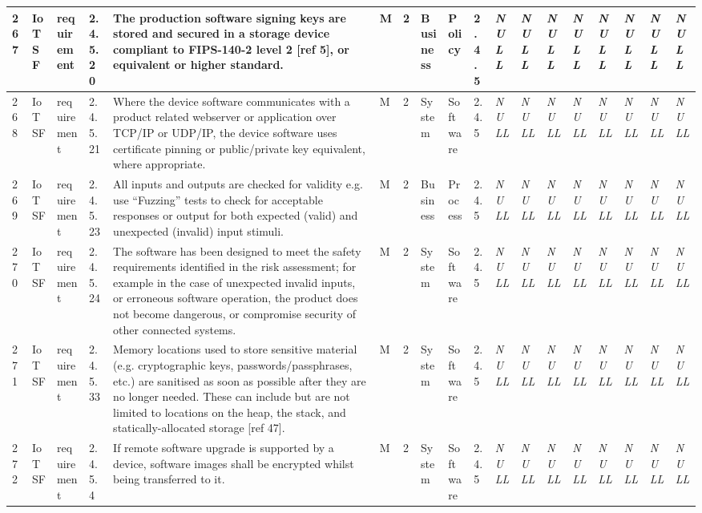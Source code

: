\begin{longtable}{|l|l|l|l|l|l|l|l|l|l|l|l|l|l|l|l|l|l|}
267 & IoTSF & requirement & 2.4.5.20 & The production software signing keys are stored and secured in a storage device compliant to FIPS-140-2 level 2 [ref 5], or equivalent or higher standard. & M & 2 & Business & Policy & 2.4.5 & \textit{NULL} & \textit{NULL} & \textit{NULL} & \textit{NULL} & \textit{NULL} & \textit{NULL} & \textit{NULL} & \textit{NULL} \\ \hline 
268 & IoTSF & requirement & 2.4.5.21 & Where the device software communicates with a product related webserver or application over TCP/IP or UDP/IP, the device software uses certificate pinning or public/private key equivalent, where appropriate. & M & 2 & System & Software & 2.4.5 & \textit{NULL} & \textit{NULL} & \textit{NULL} & \textit{NULL} & \textit{NULL} & \textit{NULL} & \textit{NULL} & \textit{NULL} \\ \hline 
269 & IoTSF & requirement & 2.4.5.23 & All inputs and outputs are checked for validity e.g. use “Fuzzing” tests to check for acceptable responses or output for both expected (valid) and unexpected (invalid) input stimuli. & M & 2 & Business & Process & 2.4.5 & \textit{NULL} & \textit{NULL} & \textit{NULL} & \textit{NULL} & \textit{NULL} & \textit{NULL} & \textit{NULL} & \textit{NULL} \\ \hline 
270 & IoTSF & requirement & 2.4.5.24 & The software has been designed to meet the safety requirements identified in the risk assessment; for example in the case of unexpected invalid inputs, or erroneous software operation, the product does not become dangerous, or compromise security of other connected systems. & M & 2 & System & Software & 2.4.5 & \textit{NULL} & \textit{NULL} & \textit{NULL} & \textit{NULL} & \textit{NULL} & \textit{NULL} & \textit{NULL} & \textit{NULL} \\ \hline 
271 & IoTSF & requirement & 2.4.5.33 & Memory locations used to store sensitive material (e.g. cryptographic keys, passwords/passphrases, etc.) are sanitised as soon as possible after they are no longer needed. These can include but are not limited to locations on the heap, the stack, and statically-allocated storage [ref 47]. & M & 2 & System & Software & 2.4.5 & \textit{NULL} & \textit{NULL} & \textit{NULL} & \textit{NULL} & \textit{NULL} & \textit{NULL} & \textit{NULL} & \textit{NULL} \\ \hline 
272 & IoTSF & requirement & 2.4.5.4 & If remote software upgrade is supported by a device, software images shall be encrypted whilst being transferred to it. & M & 2 & System & Software & 2.4.5 & \textit{NULL} & \textit{NULL} & \textit{NULL} & \textit{NULL} & \textit{NULL} & \textit{NULL} & \textit{NULL} & \textit{NULL} \\ \hline 

\end{longtable}
